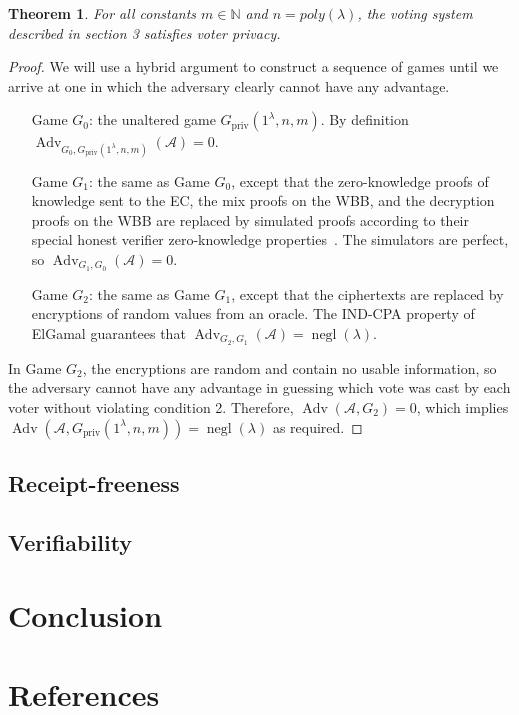 \documentclass[11pt,twoside,a4paper]{article}
\DeclareMathOperator{\negl}{\text{negl}}
\DeclareMathOperator{\Adv}{\text{Adv}}
\newtheorem{theorem}{Theorem}[section]
\theoremstyle{definition}
\begin{document}
\begin{theorem}
    For all constants $m \in \mathbb{N}$ and $n=poly(\lambda)$, the voting system described in section 3 satisfies voter privacy.
\end{theorem}
\begin{proof}
    We will use a hybrid argument to construct a sequence of games until we arrive at one in which the adversary clearly cannot have any advantage.
    \begin{itemize}[leftmargin=4em]
        \item[Game] $G_0$: the unaltered game $G_{\text{priv}}(1^\lambda, n, m)$. By definition $\Adv_{G_0, G_{\text{priv}}(1^\lambda, n, m)}(\mathcal{A})=0$.
        
        \item[Game] $G_1$: the same as Game $G_0$, except that the zero-knowledge proofs of knowledge sent to the EC, the mix proofs on the WBB, and the decryption proofs on the WBB are replaced by simulated proofs according to their special honest verifier zero-knowledge properties~\cite{boneh2020graduate}. The simulators are perfect, so $\Adv_{G_1, G_0}(\mathcal{A})=0$.
        
        \item[Game] $G_2$: the same as Game $G_1$, except that the ciphertexts are replaced by encryptions of random values from an oracle. The IND-CPA property of ElGamal guarantees that $\Adv_{G_2,G_1}(\mathcal{A})=\negl(\lambda)$.
    \end{itemize}
    In Game $G_2$, the encryptions are random and contain no usable information, so the adversary cannot have any advantage in guessing which vote was cast by each voter without violating condition 2. Therefore, $\Adv(\mathcal{A}, G_2)=0$, which implies $\Adv\left(\mathcal{A}, G_{\text{priv}}(1^\lambda, n, m)\right)=\negl(\lambda)$ as required.
\end{proof}
\subsection{Receipt-freeness}
\subsection{Verifiability}
\section{Conclusion}
\newpage
\section{References}


\newpage
\appendix
\end{document}

